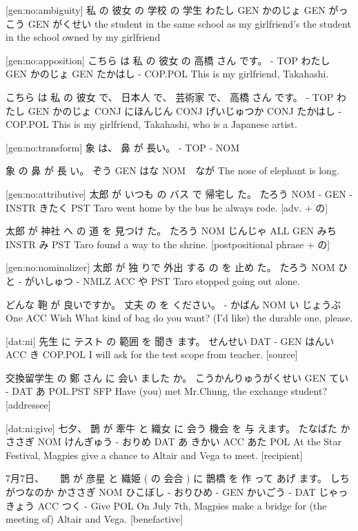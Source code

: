 [gen:no:ambiguity]
私    の   彼女    の  学校     の  学生
わたし GEN かのじょ GEN がっこう GEN がくせい
the student in the same school as my girlfriend's
the student in the school owned by my girlfriend

[gen:no:apposition]
こちら は 私     の  彼女    の  高橋   さん です。
-    TOP わたし GEN かのじょ GEN たかはし - COP.POL
This is my girlfriend, Takahashi.

こちら は  私    の  彼女    で、  日本人    で、  芸術家      で、  高橋   さん です。
-    TOP わたし GEN かのじょ CONJ にほんじん CONJ げいじゅつか CONJ たかはし - COP.POL
This is my girlfriend, Takahashi, who is a Japanese artist.

[gen:no:transform]
象 は、 鼻 が  長い。
-  TOP - NOM

象   の   鼻  が   長 い。
ぞう GEN はな NOM　なが
The nose of elephant is long.

[gen:no:attributive]
太郎   が いつも の  バス で    帰宅し た。
たろう NOM -   GEN  - INSTR きたく PST
Taro went home by the bus he always rode. [adv. + の]

太郎   が  神社    へ   の  道   を    見つけ た。
たろう NOM じんじゃ ALL GEN みち INSTR み    PST
Taro found a way to the shrine. [postpositional phrase + の]

[gen:no:nominalizer]
太郎   が  独 りで 外出 する   の    を  止め た。
たろう NOM ひと - がいしゅつ - NMLZ ACC や PST
Taro stopped going out alone.

どんな 鞄   が   良いですか。 丈夫    の  を ください。
-    かばん NOM い         じょうぶ One ACC Wish
What kind of bag do you want? (I'd like) the durable one, please.

[dat:ni]
先生    に テスト の 範囲    を  聞き ます。
せんせい DAT -   GEN はんい ACC き COP.POL
I will ask for the test scope from teacher. [source]

交換留学生           の  鄭 さん に 会い ました    か。
こうかんりゅうがくせい GEN てい - DAT あ  POL.PST SFP
Have (you) met Mr.Chung, the exchange student? [addressee]

[dat:ni:give]
七夕、     鵲    が    牽牛   と  織女  に  会う 機会  を   与 えます。
たなばた かささぎ NOM けんぎゅう - おりめ DAT あ  きかい ACC あた POL
At the Star Festival, Magpies give a chance to Altair and Vega to meet. [recipient]

7月7日、 　     鵲    が   彦星   と  織姫   (  の   会合  )  に   鵲橋       を  作 って あげ ます。
しちがつなのか かささぎ NOM ひこぼし - おりひめ - GEN かいごう - DAT じゃっきょう ACC つく - Give POL
On July 7th, Magpies make a bridge for (the meeting of) Altair and Vega. [benefactive]

